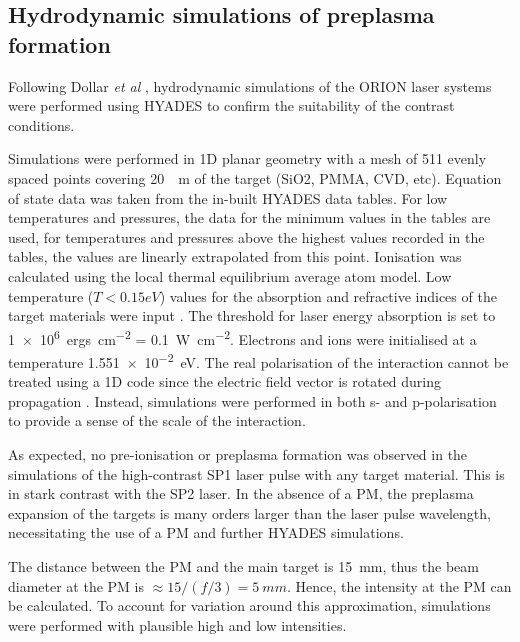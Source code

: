 \subsection{Hydrodynamic simulations of preplasma formation}\label{sec:orion-hydro}
Following Dollar \textit{et al} \cite{dollarScalingHighorderHarmonic2013}, hydrodynamic simulations of the ORION laser systems were performed using HYADES to confirm the suitability of the contrast conditions.

Simulations were performed in 1D planar geometry with a mesh of 511 evenly spaced points covering \qty{20}{\mu m} of the target (SiO2, PMMA, CVD, etc). Equation of state data was taken from the in-built HYADES data tables. For low temperatures and pressures, the data for the minimum values in the tables are used, for temperatures and pressures above the highest values recorded in the tables, the values are linearly extrapolated from this point. Ionisation was calculated using the local thermal equilibrium average atom model. Low temperature ($T < 0.15 eV$) values for the absorption and refractive indices of the target materials were input \cite{polyanskiyRefractiveindexInfoDatabase2024}.
The threshold for laser energy absorption is set to \qty{1e6}{ergs.cm^{-2}} = \qty{0.1}{W.cm^{-2}}. Electrons and ions were initialised at a temperature \qty{1.551e-2}{eV}. The real polarisation of the interaction cannot be treated using a 1D code since the electric field vector is rotated during propagation \cite{larsenQuestionSourceWave2023}. Instead, simulations were performed in both s- and p-polarisation to provide a sense of the scale of the interaction.

As expected, no pre-ionisation or preplasma formation was observed in the simulations of the high-contrast SP1 laser pulse with any target material. This is in stark contrast with the SP2 laser. In the absence of a PM, the preplasma expansion of the targets is many orders larger than the laser pulse wavelength, necessitating the use of a PM and further HYADES simulations.

The distance between the PM and the main target is \qty{15}{mm}, thus the beam diameter at the PM is $\approx 15/(f/3) = \qty{5}{mm}$. Hence, the intensity at the PM can be calculated. To account for variation around this approximation, simulations were performed with plausible high and low intensities.


